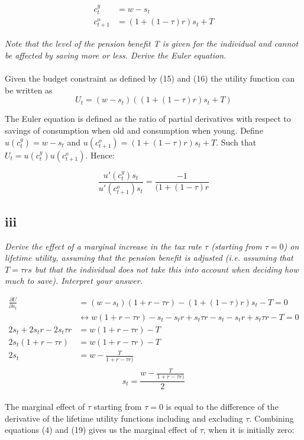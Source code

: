 \documentclass[11pt,a4paper]{article}
\begin{document}
\begin{align}
c^y_t&=w-s_t \\
c^o_{t+1}&=(1+(1-\tau)r)s_t+T
\end{align}

\textit{Note that the level of the pension benefit T is given for the individual and
cannot be affected by saving more or less.
Derive the Euler equation.} \\ \\
Given the budget constraint as defined by (15) and (16) the utility function can be written as
\begin{equation}
U_t=(w-s_t)((1+(1-\tau)r)s_t+T)
\end{equation}

The Euler equation is defined as the ratio of partial derivatives with respect to savings of consumption when old and consumption when young. Define $u(c^y_t) = w-s_t$ and $u(c^o_{t+1}) = (1+(1-\tau)r)s_t+T$. Such that $U_t=u(c^y_t)u(c^o_{t+1})$. Hence:

\begin{equation}
\frac{u'(c^y_t)s_t}{u'(c^o_{t+1})s_t}=\frac{-1}{(1+(1-\tau)r}
\end{equation}

    \subsection{iii}
\textit{Derive the effect of a marginal increase in the tax rate $\tau$ (starting from $\tau=0$) on lifetime utility, assuming that the pension benefit is adjusted (i.e. assuming that $T = \tau rs$ but that the individual does not take this into account when deciding how much to save). Interpret your answer.}

\begin{align*}
\frac{\partial U}{\partial s_t}&=(w-s_t)(1+r-\tau r)-(1+(1-\tau)r)s_t-T=0 \\
&\leftrightarrow w(1+r-\tau r)-s_t-s_t r +s_t \tau r -s_t -s_t r + s_t \tau r -T =0 \\
2s_t+2s_t r-2s_t \tau r &=w(1+r-\tau r)-T \\
2s_t(1+r-\tau r)&=w(1+r-\tau r) -T \\
2s_t&=w-\frac{T}{1+r-\tau r)}\\
\end{align*}
\begin{equation}
s_t=\frac{w-\frac{T}{1+r-\tau r)}}{2}
\end{equation} \\
The marginal effect of $\tau$ starting from $\tau=0$ is equal to the difference of the derivative of the lifetime utility functions including and excluding $\tau$. Combining equations (4) and (19) gives us the marginal effect of $\tau$, when it is initially zero:
\end{document}
